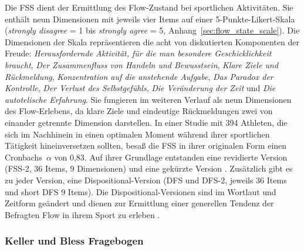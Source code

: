 \label{ssub:flow_state_scale}

Die \ac{FSS} dient der Ermittlung des Flow-Zustand bei sportlichen Aktivitäten. Sie enthält neun Dimensionen mit jeweils vier Items auf einer 5-Punkte-Likert-Skala (\emph{strongly disagree} = 1 bis \emph{strongly agree} = 5, Anhang~\ref{sec:flow_state_scale}). Die Dimensionen der Skala repräsentieren die acht von \citet[S. 73-101]{Csikszentmihalyi1992} diskutierten Komponenten der Freude: \emph{Herausfordernde Aktivität, für die man besondere Geschicklichkeit braucht}, \emph{Der Zusammenfluss von Handeln und Bewusstsein}, \emph{Klare Ziele und Rückmeldung}, \emph{Konzentration auf die anstehende Aufgabe}, \emph{Das Paradox der Kontrolle}, \emph{Der Verlust des Selbstgefühls}, \emph{Die Veränderung der Zeit} und \emph{Die autotelische Erfahrung}. Sie fungieren im weiteren Verlauf als neun Dimensionen des Flow-Erlebens, da klare Ziele und eindeutige Rückmeldungen zwei von einander getrennte Dimension darstellen. In einer Studie mit 394 Athleten, die sich im Nachhinein in einen optimalen Moment während ihrer sportlichen Tätigkeit hineinversetzen sollten, besaß die \ac{FSS} in ihrer originalen Form einen Cronbachs~$\alpha$ von 0,83. Auf ihrer Grundlage entstanden eine revidierte Version (FSS-2, 36 Items, 9 Dimensionen) und eine gekürzte Version \citep[short FSS-2, 9 Items,][]{Jackson2002, Jackson2008}. Zusätzlich gibt es zu jeder Version, eine Dispositional-Version (\acs{DFS} und DFS-2, jeweils 36 Items und short DFS 9 Items). Die Dispositional-Versionen sind im Wortlaut und Zeitform geändert und dienen zur Ermittlung einer generellen Tendenz der Befragten Flow in ihrem Sport zu erleben \citep[][S.~356]{Jackson1998}.

\subsubsection{Keller und Bless Fragebogen} 

\label{ssub:keller_und_bless_fragebogen}

